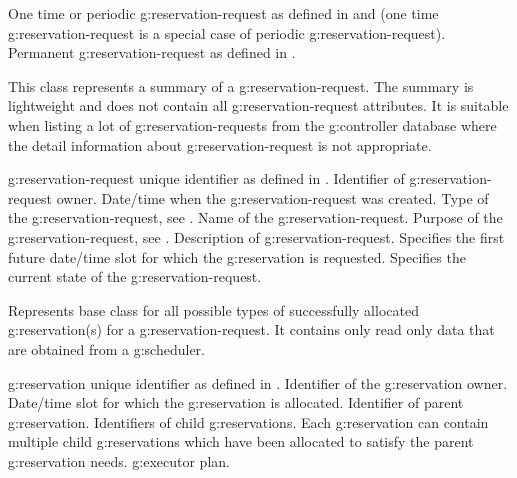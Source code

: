 \begin{Api}
\begin{ApiEnumValues}
 One time or periodic \gls{g:reservation-request} as defined in  and  (one time \gls{g:reservation-request} is a special case of periodic \gls{g:reservation-request}).
 Permanent \gls{g:reservation-request} as defined in .
\end{ApiEnumValues}

This class represents a summary of a \gls{g:reservation-request}. The summary is lightweight and does not contain all \gls{g:reservation-request} attributes. It is suitable when listing a lot of \glspl{g:reservation-request} from the \gls{g:controller} database where the detail information about \gls{g:reservation-request} is not appropriate.
\begin{ApiClassAttributes}
 \Gls{g:reservation-request} unique identifier as defined in .
 Identifier of \gls{g:reservation-request} owner.
 Date/time when the \gls{g:reservation-request} was created.
 Type of the \gls{g:reservation-request}, see .
 Name of the \gls{g:reservation-request}.
 Purpose of the \gls{g:reservation-request}, see .
 Description of \gls{g:reservation-request}.
 Specifies the first future date/time slot for which the \gls{g:reservation} is requested.
 Specifies the current state of the \gls{g:reservation-request}. 
\end{ApiClassAttributes}

Represents base class for all possible types of successfully allocated \gls{g:reservation}(s) for a \gls{g:reservation-request}. It contains only read only data that are obtained from a \gls{g:scheduler}.
\begin{ApiClassAttributes}
 \Gls{g:reservation} unique identifier as defined in .
 Identifier of the \gls{g:reservation} owner.
 Date/time slot for which the \gls{g:reservation} is allocated.
 Identifier of parent \gls{g:reservation}.
 Identifiers of child \glspl{g:reservation}. Each \gls{g:reservation} can contain multiple child \glspl{g:reservation} which have been allocated to satisfy the parent \gls{g:reservation} needs.
 \Gls{g:executor} plan.
\end{ApiClassAttributes}


\end{Api}
